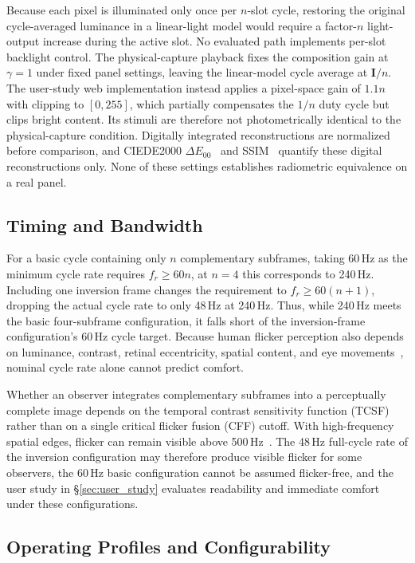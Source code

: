 \documentclass{ieeeaccess}
\begin{document}
Because each pixel is illuminated only once per $n$-slot cycle, restoring the original cycle-averaged luminance in a linear-light model would require a factor-$n$ light-output increase during the active slot. No evaluated path implements per-slot backlight control. The physical-capture playback fixes the composition gain at $\gamma=1$ under fixed panel settings, leaving the linear-model cycle average at $\mathbf{I}/n$. The user-study web implementation instead applies a pixel-space gain of $1.1n$ with clipping to $[0,255]$, which partially compensates the $1/n$ duty cycle but clips bright content. Its stimuli are therefore not photometrically identical to the physical-capture condition. Digitally integrated reconstructions are normalized before comparison, and CIEDE2000 $\Delta E_{00}$~\cite{b_ciede2000} and SSIM~\cite{b_wang2004} quantify these digital reconstructions only. None of these settings establishes radiometric equivalence on a real panel.

\subsection{Timing and Bandwidth}

For a basic cycle containing only $n$ complementary subframes, taking 60\,Hz as the minimum cycle rate requires $f_r\geq60n$, at $n=4$ this corresponds to 240\,Hz. Including one inversion frame changes the requirement to $f_r\geq60(n+1)$, dropping the actual cycle rate to only 48\,Hz at 240\,Hz. Thus, while 240\,Hz meets the basic four-subframe configuration, it falls short of the inversion-frame configuration's 60\,Hz cycle target. Because human flicker perception also depends on luminance, contrast, retinal eccentricity, spatial content, and eye movements~\cite{b_cai2024,b_davis2015}, nominal cycle rate alone cannot predict comfort.

Whether an observer integrates complementary subframes into a perceptually complete image depends on the temporal contrast sensitivity function (TCSF) rather than on a single critical flicker fusion (CFF) cutoff. With high-frequency spatial edges, flicker can remain visible above 500\,Hz~\cite{b_davis2015}. The 48\,Hz full-cycle rate of the inversion configuration may therefore produce visible flicker for some observers, the 60\,Hz basic configuration cannot be assumed flicker-free, and the user study in \S\ref{sec:user_study} evaluates readability and immediate comfort under these configurations.

\subsection{Operating Profiles and Configurability}
\label{sec:hardened}
\end{document}
